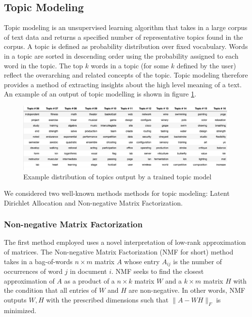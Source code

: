 \documentclass[fleqn,10pt]{JLA_article} %
\begin{document}
\subsection{Topic Modeling}
Topic modeling is an unsupervised learning algorithm that takes in a large corpus of text data and returns a specified number of representative topics found in the corpus. A topic is defined as probability distribution over fixed vocabulary. Words in a topic are sorted in descending order using the probability assigned to each word in the topic. The top $k$ words in a topic (for some $k$ defined by the user) reflect the overarching and related concepts of the topic. Topic modeling therefore provides a method of extracting insights about the high level meaning of a text. 
An example of an output of topic modelling is shown in figure \ref{fig:distribution}.
\begin{figure}[H]
    \centering
    \includegraphics[scale=0.5]{topic-distribution.png}
    \caption{Example distribution of topics output by a trained topic model}
    \label{fig:distribution}
\end{figure}
We considered two well-known methods methods for topic modeling: Latent Dirichlet Allocation and Non-negative Matrix Factorization.

\subsubsection{Non-negative Matrix Factorization}

The first method employed uses a novel interpretation of low-rank approximation of matrices. The Non-negative Matrix Factorization (NMF for short) method takes in a bag-of-words $n\times m$ matrix $A$ whose entry $A_{ij}$ is the number of occurrences of word $j$ in document $i$. NMF seeks to find the closest approximation of $A$ as a product of a $n\times k$ matrix $W$ and a $k\times m$ matrix $H$ with the condition that all entries of $W$ and $H$ are non-negative. In other words, NMF outputs $W,H$ with the prescribed dimensions such that $\|A-WH\|_F$ is minimized.
\end{document}

